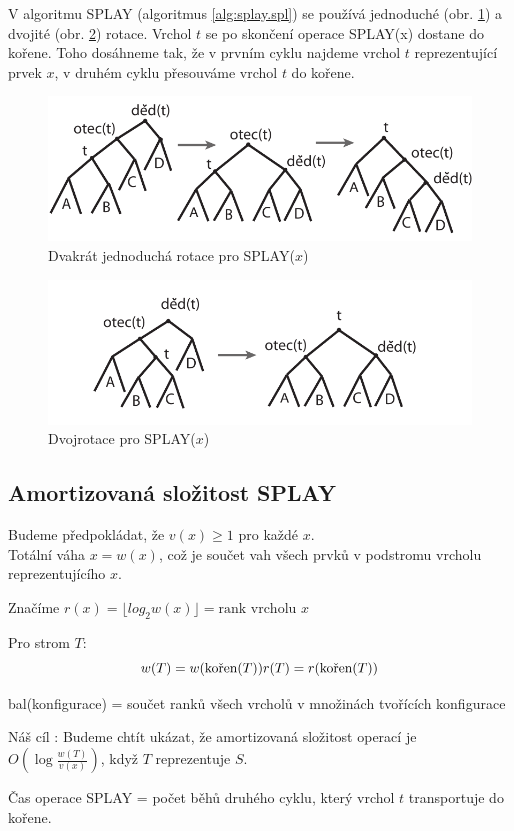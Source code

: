 V algoritmu
SPLAY (algoritmus \ref{alg:splay.spl}) se používá jednoduché 
(obr. \ref{splay-rot}) a dvojité (obr. \ref{splay-dvojrot}) rotace.
Vrchol $t$ se po skončení operace SPLAY(x) dostane do kořene. Toho
dosáhneme tak, že v prvním cyklu najdeme vrchol $t$ reprezentující prvek
$x$, v druhém cyklu přesouváme vrchol $t$ do kořene.

\begin{figure}[!htb]
\centering\includegraphics{pics/splay-rot}
\caption{Dvakrát jednoduchá rotace pro SPLAY($x$)}
\label{splay-rot}
\end{figure}

\begin{figure}[!htb]
\centering\includegraphics{pics/splay-dvojrot}
\caption{Dvojrotace pro SPLAY($x$)}
\label{splay-dvojrot}
\end{figure}


\subsection{Amortizovaná složitost SPLAY}

Budeme předpokládat, že $v(x) \geq 1$ pro každé $x$. \\
Totální váha $x = w(x)$, což je součet vah všech prvků v podstromu vrcholu
reprezentujícího $x$.
\par
Značíme $r(x) = \lfloor log_2 w(x)\rfloor = \text{rank vrcholu } x$
\par
Pro strom $T$: \\
$$w(T) = w(\text{kořen}(T)) \\
r(T) = r(\text{kořen}(T))$$
\par
bal(konfigurace) = součet ranků všech vrcholů v množinách tvořících
konfigurace
\par
Náš cíl : Budeme chtít ukázat, že amortizovaná složitost operací je
$O(\log\frac{w(T)}{v(x)})$, když $T$ reprezentuje $S$.
\par
Čas operace SPLAY = počet běhů druhého cyklu, který vrchol $t$ 
transportuje do kořene.


